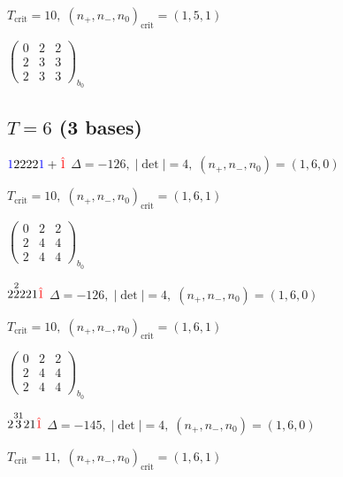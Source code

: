 \documentclass[10pt]{article}
\begin{document}
\hspace{1em}$T_{\text{crit}}=10,\; (n_+,n_-,n_0)_{\text{crit}}=(1,5,1)$

\hspace{2em}$\left(\begin{smallmatrix}0 & 2 & 2 \\ 2 & 3 & 3 \\ 2 & 3 & 3\end{smallmatrix}\right)_{\!b_0}$


\subsection*{$T = 6$ \quad (3 bases)}
\smallskip

$\textcolor{blue}{1}2222\textcolor{blue}{1}+\textcolor{red}{\hat{1}}$ \quad $\Delta=-126,\; |\det|=4,\; (n_+,n_-,n_0)=(1,6,0)$

\hspace{1em}$T_{\text{crit}}=10,\; (n_+,n_-,n_0)_{\text{crit}}=(1,6,1)$

\hspace{2em}$\left(\begin{smallmatrix}0 & 2 & 2 \\ 2 & 4 & 4 \\ 2 & 4 & 4\end{smallmatrix}\right)_{\!b_0}$

\smallskip

$2\overset{2}{2}221\textcolor{red}{\hat{1}}$ \quad $\Delta=-126,\; |\det|=4,\; (n_+,n_-,n_0)=(1,6,0)$

\hspace{1em}$T_{\text{crit}}=10,\; (n_+,n_-,n_0)_{\text{crit}}=(1,6,1)$

\hspace{2em}$\left(\begin{smallmatrix}0 & 2 & 2 \\ 2 & 4 & 4 \\ 2 & 4 & 4\end{smallmatrix}\right)_{\!b_0}$

\smallskip

$2\overset{31}{3}21\textcolor{red}{\hat{1}}$ \quad $\Delta=-145,\; |\det|=4,\; (n_+,n_-,n_0)=(1,6,0)$

\hspace{1em}$T_{\text{crit}}=11,\; (n_+,n_-,n_0)_{\text{crit}}=(1,6,1)$
\end{document}
